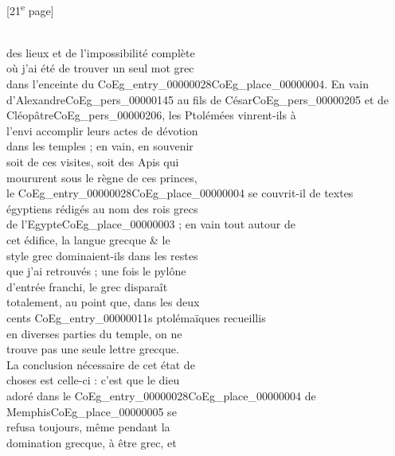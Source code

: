 \documentclass{book}
\begin{document}
{{\footnotesize\begin{center} {[21\textsuperscript{e} page]}\end{center}}

\begin{paracol}{2}
\noindent \\
\switchcolumn
\noindent des lieux et de l’impossibilité complète\\
où j’ai été de trouver un seul mot grec\\
dans l’enceinte du \Gls{CoEg_entry_00000028}\gls{CoEg_place_00000004}. En vain\\
d’Alexandre\gls{CoEg_pers_00000145} au fils de César\gls{CoEg_pers_00000205} et de\\
Cléopâtre\gls{CoEg_pers_00000206}, les Ptolémées vinrent-ils à\\
l’envi accomplir leurs actes de dévotion\\
dans les temples ; en vain, en souvenir\\
soit de ces visites, soit des Apis qui\\
moururent sous le règne de ces princes,\\
le \Gls{CoEg_entry_00000028}\gls{CoEg_place_00000004} se couvrit-il de textes\\
égyptiens rédigés au nom des rois grecs\\
de l’Egypte\gls{CoEg_place_00000003} ; en vain tout autour de\\
cet édifice, la langue grecque \& le\\
style grec dominaient-ils dans les restes\\
que j’ai retrouvés ; une fois le pylône\\
d’entrée franchi, le grec disparaît\\
totalement, au point que, dans les deux\\
cents \glspl{CoEg_entry_00000011} ptolémaïques recueillis\\
en diverses parties du temple, on ne\\
trouve pas une seule lettre grecque.\\
La conclusion nécessaire de cet état de\\
choses est celle-ci : c’est que le dieu\\
adoré dans le \Gls{CoEg_entry_00000028}\gls{CoEg_place_00000004} de Memphis\gls{CoEg_place_00000005} se\\
refusa toujours, même pendant la\\
domination grecque, à être grec, et\\

\end{paracol}}
\end{document}
